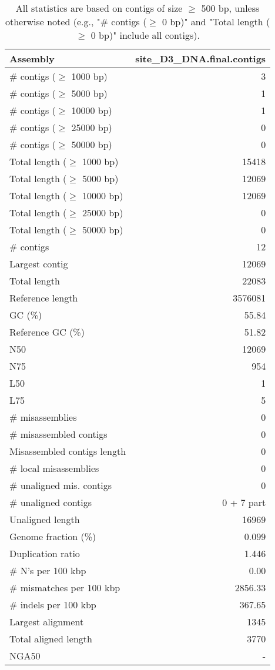 \documentclass[12pt,a4paper]{article}
\begin{document}
\begin{table}[ht]
\begin{center}
\caption{All statistics are based on contigs of size $\geq$ 500 bp, unless otherwise noted (e.g., "\# contigs ($\geq$ 0 bp)" and "Total length ($\geq$ 0 bp)" include all contigs).}
\begin{tabular}{|l*{1}{|r}|}
\hline
Assembly & site\_D3\_DNA.final.contigs \\ \hline
\# contigs ($\geq$ 1000 bp) & 3 \\ \hline
\# contigs ($\geq$ 5000 bp) & 1 \\ \hline
\# contigs ($\geq$ 10000 bp) & 1 \\ \hline
\# contigs ($\geq$ 25000 bp) & 0 \\ \hline
\# contigs ($\geq$ 50000 bp) & 0 \\ \hline
Total length ($\geq$ 1000 bp) & 15418 \\ \hline
Total length ($\geq$ 5000 bp) & 12069 \\ \hline
Total length ($\geq$ 10000 bp) & 12069 \\ \hline
Total length ($\geq$ 25000 bp) & 0 \\ \hline
Total length ($\geq$ 50000 bp) & 0 \\ \hline
\# contigs & 12 \\ \hline
Largest contig & 12069 \\ \hline
Total length & 22083 \\ \hline
Reference length & 3576081 \\ \hline
GC (\%) & 55.84 \\ \hline
Reference GC (\%) & 51.82 \\ \hline
N50 & 12069 \\ \hline
N75 & 954 \\ \hline
L50 & 1 \\ \hline
L75 & 5 \\ \hline
\# misassemblies & 0 \\ \hline
\# misassembled contigs & 0 \\ \hline
Misassembled contigs length & 0 \\ \hline
\# local misassemblies & 0 \\ \hline
\# unaligned mis. contigs & 0 \\ \hline
\# unaligned contigs & 0 + 7 part \\ \hline
Unaligned length & 16969 \\ \hline
Genome fraction (\%) & 0.099 \\ \hline
Duplication ratio & 1.446 \\ \hline
\# N's per 100 kbp & 0.00 \\ \hline
\# mismatches per 100 kbp & 2856.33 \\ \hline
\# indels per 100 kbp & 367.65 \\ \hline
Largest alignment & 1345 \\ \hline
Total aligned length & 3770 \\ \hline
NGA50 & - \\ \hline
\end{tabular}
\end{center}
\end{table}
\end{document}
